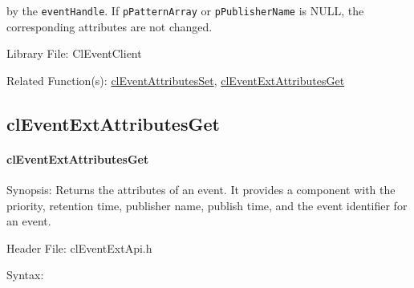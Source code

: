 \begin{flushleft}
\begin{Desc}
	by the {\tt{eventHandle}}. If {\tt{pPatternArray}} or {\tt{pPublisherName}} is NULL, the corresponding attributes are not changed. \end{Desc}
\begin{Desc}
\item[Library File:]Cl\-Event\-Client\end{Desc}
\begin{Desc}
\item[Related Function(s):]\hyperlink{pageem109}{cl\-Event\-Attributes\-Set}, \hyperlink{pageem204}{cl\-Event\-Ext\-Attributes\-Get} \end{Desc}
\newpage


\subsection{clEventExtAttributesGet}
\hypertarget{pageem204}{}\paragraph{cl\-Event\-Ext\-Attributes\-Get}\label{pageem204}
\begin{Desc}
\item[Synopsis:]Returns the attributes of an event. It provides a component with the priority, retention time, publisher name, publish time, 
and the event identifier for an event.
\end{Desc}
\begin{Desc}
\item[Header File:]clEventExtApi.h\end{Desc}
\begin{Desc}
\item[Syntax:]


\end{Desc}
\end{flushleft}
